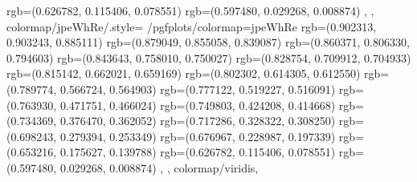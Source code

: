 {{{                    rgb=(0.626782, 0.115406, 0.078551)
                    rgb=(0.597480, 0.029268, 0.008874)
                },
        },
    colormap/jpeWhRe/.style={%
            /pgfplots/colormap={jpeWhRe}{%
                    rgb=(0.902313, 0.903243, 0.885111)
                    rgb=(0.879049, 0.855058, 0.839087)
                    rgb=(0.860371, 0.806330, 0.794603)
                    rgb=(0.843643, 0.758010, 0.750027)
                    rgb=(0.828754, 0.709912, 0.704933)
                    rgb=(0.815142, 0.662021, 0.659169)
                    rgb=(0.802302, 0.614305, 0.612550)
                    rgb=(0.789774, 0.566724, 0.564903)
                    rgb=(0.777122, 0.519227, 0.516091)
                    rgb=(0.763930, 0.471751, 0.466024)
                    rgb=(0.749803, 0.424208, 0.414668)
                    rgb=(0.734369, 0.376470, 0.362052)
                    rgb=(0.717286, 0.328322, 0.308250)
                    rgb=(0.698243, 0.279394, 0.253349)
                    rgb=(0.676967, 0.228987, 0.197339)
                    rgb=(0.653216, 0.175627, 0.139788)
                    rgb=(0.626782, 0.115406, 0.078551)
                    rgb=(0.597480, 0.029268, 0.008874)
                },
        },
    colormap/viridis,
}
